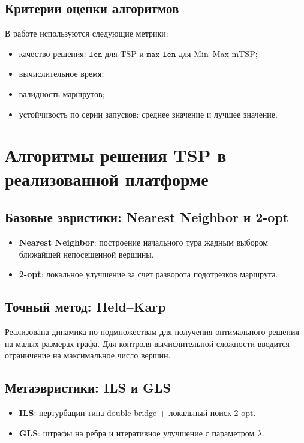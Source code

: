 \documentclass[a4paper,12pt]{extarticle}
\begin{document}
\subsection{Критерии оценки алгоритмов}
В работе используются следующие метрики:
\begin{itemize}
    \item качество решения: $\texttt{len}$ для TSP и $\texttt{max\_len}$ для Min--Max mTSP;
    \item вычислительное время;
    \item валидность маршрутов;
    \item устойчивость по серии запусков: среднее значение и лучшее значение.
\end{itemize}

\pagebreak

\section{Алгоритмы решения TSP в реализованной платформе}

\subsection{Базовые эвристики: Nearest Neighbor и 2-opt}
\begin{itemize}
    \item \textbf{Nearest Neighbor}: построение начального тура жадным выбором ближайшей непосещенной вершины.
    \item \textbf{2-opt}: локальное улучшение за счет разворота подотрезков маршрута.
\end{itemize}

\subsection{Точный метод: Held--Karp}
Реализована динамика по подмножествам для получения оптимального решения на малых размерах графа.
Для контроля вычислительной сложности вводится ограничение на максимальное число вершин.

\subsection{Метаэвристики: ILS и GLS}
\begin{itemize}
    \item \textbf{ILS}: пертурбации типа double-bridge + локальный поиск 2-opt.
    \item \textbf{GLS}: штрафы на ребра и итеративное улучшение с параметром $\lambda$.
\end{itemize}
\end{document}
